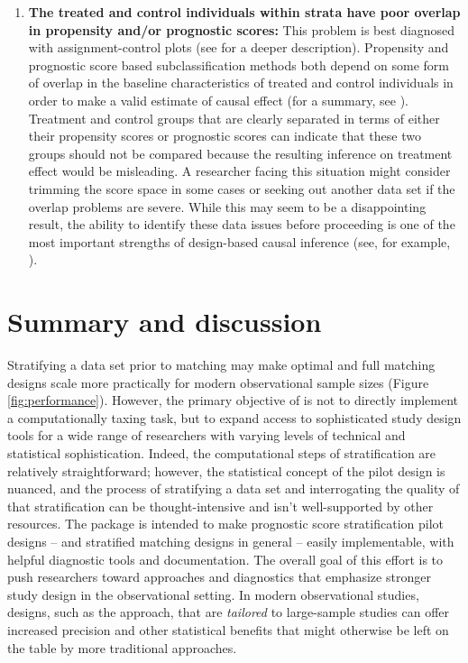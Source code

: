 \begin{enumerate}
    \item \textbf{The treated and control individuals within strata have poor overlap in propensity and/or prognostic scores:} This problem is best diagnosed with assignment-control plots (see \citet{aikens2020pilot} for a deeper description). Propensity and prognostic score based subclassification methods both depend on some form of overlap in the baseline characteristics of treated and control individuals in order to make a valid estimate of causal effect (for a summary, see \citet{leacy2014joint}).  Treatment and control groups that are clearly separated in terms of either their propensity scores or prognostic scores can indicate that these two groups should not be compared because the resulting inference on treatment effect would be misleading.  A researcher facing this situation might consider trimming the score space \citep{glynn2019comparison} in some cases or seeking out another data set if the overlap problems are severe. While this may seem to be a disappointing result, the ability to identify these data issues before proceeding is one of the most important strengths of design-based causal inference (see, for example, \citet{austin2011introduction}).
\end{enumerate}


\section{Summary and discussion} \label{sec:discussion}
Stratifying a data set prior to matching may make optimal and full matching designs scale more practically for modern observational sample sizes (Figure \ref{fig:performance}). However, the primary objective of  is not to directly implement a computationally taxing task, but to expand access to sophisticated study design tools for a wide range of researchers with varying levels of technical and statistical sophistication.  Indeed, the computational steps of stratification are relatively straightforward; however, the statistical concept of the pilot design is nuanced, and the process of stratifying a data set and interrogating the quality of that stratification can be thought-intensive and isn't well-supported by other resources. The  package is intended to make  prognostic score stratification pilot designs -- and stratified matching designs in general -- easily implementable, with helpful diagnostic tools and documentation. The overall goal of this effort is to push researchers toward approaches and diagnostics that emphasize stronger study design in the observational setting.  In modern observational studies, designs, such as the  approach, that are \textit{tailored} to large-sample studies can offer increased precision and other statistical benefits that might otherwise be left on the table by more traditional approaches.

